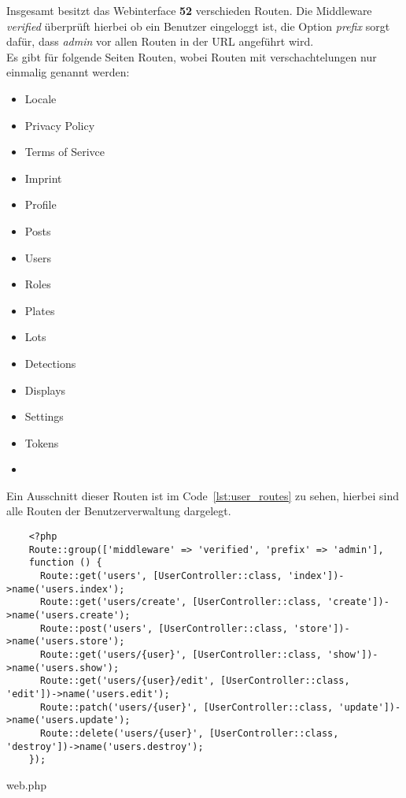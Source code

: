 Insgesamt besitzt das Webinterface \textbf{52} verschieden Routen. Die Middleware \textit{verified}
überprüft hierbei ob ein Benutzer eingeloggt ist, die Option \textit{prefix}
sorgt dafür, dass \textit{admin} vor allen Routen in der URL angeführt wird.\\

Es gibt für folgende Seiten Routen, wobei Routen mit verschachtelungen nur einmalig genannt
werden:

\begin{multicols}{2}
  \begin{itemize}
    \item Locale  \item Privacy Policy \item Terms of Serivce \item Imprint
    \item Profile \item Posts \item Users \item Roles
    \item Plates \item Lots \item Detections \item Displays
    \item Settings \item Tokens  \item[\vspace{\fill}]
  \end{itemize}
\end{multicols}

Ein Ausschnitt dieser Routen ist im Code~\ref{lst:user_routes} zu sehen, hierbei
sind alle Routen der Benutzerverwaltung dargelegt.

\begin{listing}[H]
  \begin{verbatim}
    <?php
    Route::group(['middleware' => 'verified', 'prefix' => 'admin'], 
    function () {
      Route::get('users', [UserController::class, 'index'])->name('users.index');
      Route::get('users/create', [UserController::class, 'create'])->name('users.create');
      Route::post('users', [UserController::class, 'store'])->name('users.store');
      Route::get('users/{user}', [UserController::class, 'show'])->name('users.show');
      Route::get('users/{user}/edit', [UserController::class, 'edit'])->name('users.edit');
      Route::patch('users/{user}', [UserController::class, 'update'])->name('users.update');
      Route::delete('users/{user}', [UserController::class, 'destroy'])->name('users.destroy');
    });
  \end{verbatim}
  \caption{web.php}
  \label{lst:user_routes}
\end{listing}

